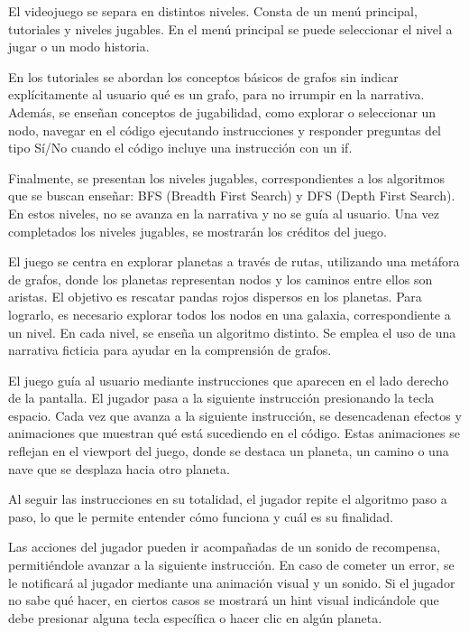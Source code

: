 El videojuego se separa en distintos niveles. Consta de un menú principal, tutoriales y niveles jugables. En el menú principal se puede seleccionar el nivel a jugar o un modo historia. 

En los tutoriales se abordan los conceptos básicos de grafos sin indicar explícitamente al usuario qué es un grafo, para no irrumpir en la narrativa. Además, se enseñan conceptos de jugabilidad, como explorar o seleccionar un nodo, navegar en el código ejecutando instrucciones y responder preguntas del tipo Sí/No cuando el código incluye una instrucción con un if.

Finalmente, se presentan los niveles jugables, correspondientes a los algoritmos que se buscan enseñar: BFS (Breadth First Search) y DFS (Depth First Search). En estos niveles, no se avanza en la narrativa y no se guía al usuario. Una vez completados los niveles jugables, se mostrarán los créditos del juego.

El juego se centra en explorar planetas a través de rutas, utilizando una metáfora de grafos, donde los planetas representan nodos y los caminos entre ellos son aristas. El objetivo es rescatar pandas rojos dispersos en los planetas. Para lograrlo, es necesario explorar todos los nodos en una galaxia, correspondiente a un nivel. En cada nivel, se enseña un algoritmo distinto. Se emplea el uso de una narrativa ficticia para ayudar en la comprensión de grafos. 

El juego guía al usuario mediante instrucciones que aparecen en el lado derecho de la pantalla. El jugador pasa a la siguiente instrucción presionando la tecla espacio. Cada vez que avanza a la siguiente instrucción, se desencadenan efectos y animaciones que muestran qué está sucediendo en el código. Estas animaciones se reflejan en el viewport del juego, donde se destaca un planeta, un camino o una nave que se desplaza hacia otro planeta. 

Al seguir las instrucciones en su totalidad, el jugador repite el algoritmo paso a paso, lo que le permite entender cómo funciona y cuál es su finalidad.

Las acciones del jugador pueden ir acompañadas de un sonido de recompensa, permitiéndole avanzar a la siguiente instrucción. En caso de cometer un error, se le notificará al jugador mediante una animación visual y un sonido. Si el jugador no sabe qué hacer, en ciertos casos se mostrará un hint visual indicándole que debe presionar alguna tecla específica o hacer clic en algún planeta.


